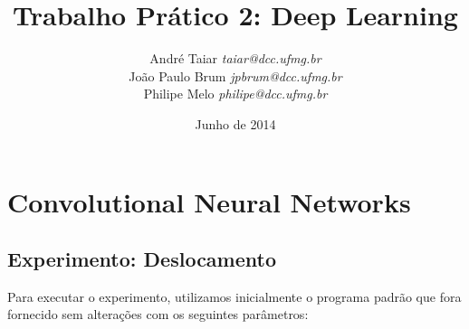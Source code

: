 \documentclass[12pt, a4paper, brazil, portuguese]{article}
\title{Trabalho Prático 2: Deep Learning}
\date{Junho de 2014}
\author{
    André Taiar      \emph{taiar@dcc.ufmg.br}   \\
    João Paulo Brum  \emph{jpbrum@dcc.ufmg.br}  \\
    Philipe Melo     \emph{philipe@dcc.ufmg.br}
  }
\begin{document}
\maketitle

\section{Convolutional Neural Networks}
%
%

\subsection{Experimento: Deslocamento }
Para executar o experimento, utilizamos inicialmente o programa padrão que fora fornecido sem
alterações com os seguintes parâmetros:
\end{document}
